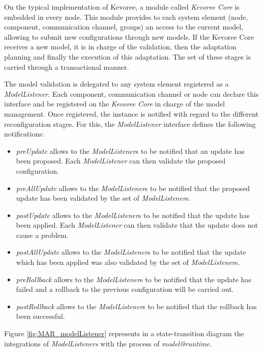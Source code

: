 On the typical implementation of Kevoree, a module called \textit{Kevoree Core} is embedded in every node. 
This module provides to each system element (node, component, communication channel, groups) an access to the current model, allowing to submit new configurations through new models.
If the Kevoree Core receives a new model, it is in charge of the validation, then the adaptation planning and finally the execution of this adaptation.
The set of these stages is carried through a transactional manner.

The model validation is delegated to any system element registered as a \textit{ModelListener}.
Each component, communication channel or node can declare this interface and be registered on the \textit{Kevoree Core} in charge of the model management.
Once registered, the instance is notified with regard to the different reconfiguration stages.
For this, the \textit{ModelListener} interface defines the following notifications:
\begin{itemize}
	\item \emph{preUpdate} allows to the \emph{ModelListener}s to be notified that an update has been proposed.
	Each \emph{ModelListener} can then validate the proposed configuration.
	\item \emph{preAllUpdate} allows to the \emph{ModelListener}s to be notified that the proposed update has been validated by the set of \emph{ModelListener}s.
	\item \emph{postUpdate} allows to the \emph{ModelListener}s to be notified that the update has been applied.
	Each \emph{ModelListener} can then validate that the update does not cause a problem.
	\item \emph{postAllUpdate} allows to the \emph{ModelListener}s to be notified that the update which has been applied was also validated by the set of \emph{ModelListener}s.
	\item \emph{preRollback} allows to the \emph{ModelListener}s to be notified that the update has failed and a rollback to the previous configuration will be carried out.
	\item \emph{postRollback} allows to the \emph{ModelListener}s to be notified that the rollback has been successful.
\end{itemize}
Figure \ref{fig:MAR_modelListener} represents in a state-transition diagram the integrations of \textit{ModelListeners} with the process of \textit{model@runtime}.

